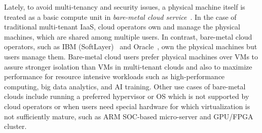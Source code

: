 Lately, to avoid multi-tenancy and security issues, a physical machine itself is 
treated as a basic compute unit in {\em bare-metal cloud service}~\cite{bms-wiki}.
In the case of traditional multi-tenant IaaS, cloud operators own and manage 
the physical machines, which are shared among multiple users.
In contrast, bare-metal cloud operators, 
such as  IBM (SoftLayer)~\cite{softlayer} and Oracle~\cite{oracle},
own the physical machines but users manage them. 
Bare-metal cloud users prefer physical machines over VMs
to assure stronger isolation than VMs in multi-tenant clouds and also 
to maximize performance for resource intensive workloads 
such as high-performance computing, big data analytics, and AI training.
Other use cases of bare-metal clouds include running a preferred hypervisor 
or OS which is not supported by cloud operators or
when users need special hardware for which virtualization 
is not sufficiently mature, such as ARM SOC-based micro-server and GPU/FPGA cluster.

